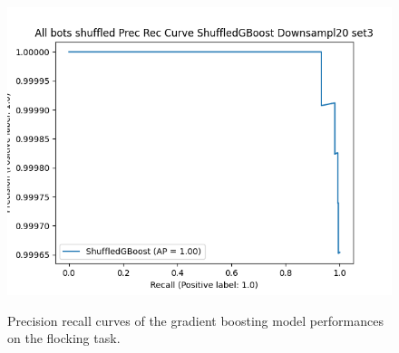 \documentclass[../../Thesis.tex]{subfiles}
\begin{document}
\begin{figure}
{							\includegraphics[scale=0.31]{../../Images/Experiments/flocking_images/All_bots_shuffled_Prec_Rec_Curve_ShuffledGBoost_Downsampl20_set3.png}
					}
					\caption{Precision recall curves of the gradient boosting model performances on the flocking task.}
					\label{fig:flocking_precision_recall_curves}
				\end{figure}
			
\end{document}
